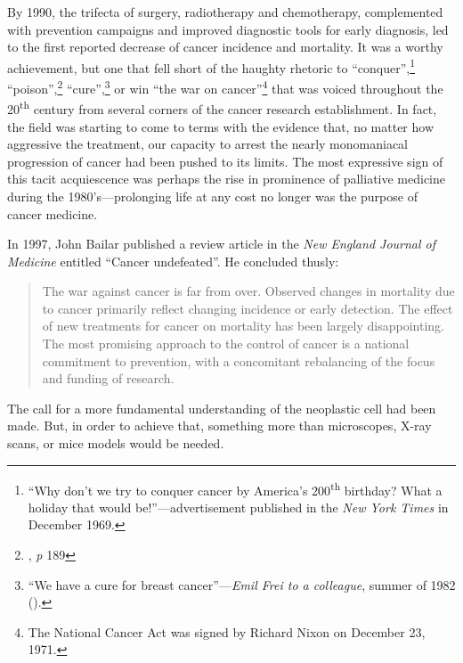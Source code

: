 By 1990, the trifecta of surgery, radiotherapy and chemotherapy, complemented
with prevention campaigns and improved diagnostic tools for early diagnosis, led
to the first reported decrease of cancer incidence and
mortality.\cite{devita_two_2012} It was a worthy achievement, but one that fell
short of the haughty rhetoric to ``conquer'',\footnote{``Why don't we try to
  conquer cancer by America's 200\textsuperscript{th} birthday? What a holiday
  that would be!''---advertisement published in the \emph{New York Times} in
  December 1969.} ``poison'',\footnote{\citealp{shorter_health_1987}, \emph{p}
  189} ``cure'',\footnote{``We have a cure for breast cancer''---\emph{Emil Frei
    to a colleague}, summer of 1982 (\citealp{mukherjee_emperor_2011}).} or win
``the war on cancer''\footnote{The National Cancer Act was signed by Richard
  Nixon on December 23, 1971.} that was voiced throughout the
20\textsuperscript{th} century from several corners of the cancer research
establishment.  In fact, the field was starting to come to terms with the
evidence that, no matter how aggressive the
treatment,\cite{berry_high-dose_2011} our capacity to arrest the nearly
monomaniacal progression of cancer had been pushed to its limits.  The most
expressive sign of this tacit acquiescence was perhaps the rise in prominence of
palliative medicine during the 1980's---prolonging life at any cost no longer
was the purpose of cancer medicine.

\medskip

In 1997, John Bailar published a review article in the \emph{New England Journal
  of Medicine} entitled ``Cancer undefeated''.\cite{bailar_cancer_1997} He
concluded thusly:

\begin{quotation}
  The war against cancer is far from over.  Observed changes in mortality due to
  cancer primarily reflect changing incidence or early detection.  The effect of
  new treatments for cancer on mortality has been largely disappointing.  The
  most promising approach to the control of cancer is a national commitment to
  prevention, with a concomitant rebalancing of the focus and funding of
  research.
\end{quotation}

The call for a more fundamental understanding of the neoplastic cell had been
made. But, in order to achieve that, something more than microscopes,
X-ray scans, or mice models would be needed.

\bigskip


